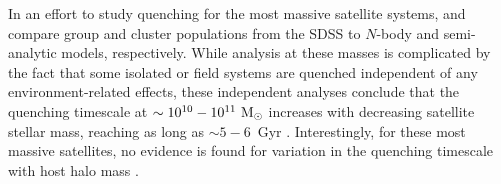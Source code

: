 In an effort to study quenching for the most massive satellite
systems, \citet{wetzel13} and \citet{delucia12} compare group and
cluster populations from the SDSS \citep{yang07} to $N$-body and
semi-analytic models, respectively. While analysis at these masses is
complicated by the fact that some isolated or field systems are
quenched independent of any environment-related effects, these
independent analyses conclude that the quenching timescale at
$\sim10^{10}-10^{11}~{\rm M}_{\odot}$ increases with decreasing satellite
stellar mass, reaching as long as $\sim 5-6$~Gyr \citep[see
also][]{hirschmann14}. Interestingly, for these most massive
satellites, no evidence is found for variation in the quenching
timescale with host halo mass \citep[][but see also
\citealt{phillips15}]{wetzel13}.



